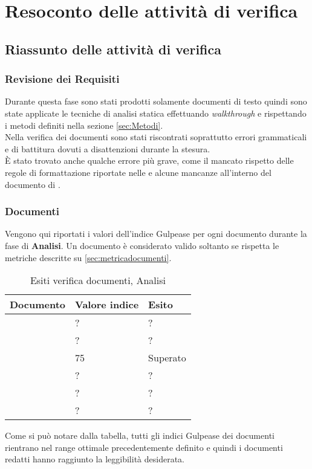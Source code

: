 \section{Resoconto delle attività di verifica}
\subsection{Riassunto delle attività di verifica}{
\subsubsection{Revisione dei Requisiti}{

Durante questa fase sono stati prodotti solamente documenti di testo quindi sono state applicate le tecniche di analisi statica effettuando \textit{walkthrough} e rispettando i metodi definiti nella sezione \ref{sec:Metodi}.\\
Nella verifica dei documenti sono stati riscontrati soprattutto errori grammaticali e di battitura dovuti a disattenzioni durante la stesura.\\
È stato trovato anche qualche errore più grave, come il mancato rispetto delle regole di formattazione riportate nelle \NormeDiProgetto e alcune mancanze all'interno del documento di \AnalisiDeiRequisiti.\\
}
\subsubsection{Documenti}{
Vengono qui riportati i valori dell’indice Gulpease per ogni documento durante la fase di \textbf{Analisi}. Un documento è considerato valido soltanto se rispetta le metriche descritte su \ref{sec:metricadocumenti}.

\begin{table}[H]
	\centering
	\begin{tabular}{p{}p{}
			p{}}
		\toprule Documento & Valore indice & Esito \\
		\midrule
		\PianoDiProgetto & ? & ? \\
		\AnalisiDeiRequisiti & ? & ? \\
		\NormeDiProgetto & 75 & \color{green} Superato \\
		\PianoDiQualifica & ? & ? \\
		\StudioDiFattibilita & ? & ? \\
		\Glossario & ? & ? \\
		\bottomrule
	\end{tabular}
	\label{tab:costorequisiti}
	\caption{Esiti verifica documenti, Analisi}
\end{table}

Come si può notare dalla tabella, tutti gli indici Gulpease dei documenti rientrano nel range ottimale precedentemente definito e quindi i documenti redatti hanno raggiunto la leggibilità desiderata.
}
}